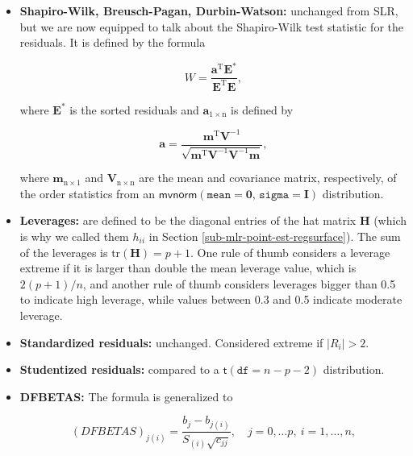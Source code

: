 \documentclass[]{book}
\providecommand{\tightlist}{%
  \setlength{\itemsep}{0pt}\setlength{\parskip}{0pt}}
\numberwithin{equation}{chapter}
\numberwithin{figure}{chapter}
\theoremstyle{plain}
\theoremstyle{definition}
\theoremstyle{remark}
\theoremstyle{definition}
\theoremstyle{definition}
\theoremstyle{remark}
\begin{document}
\begin{itemize}
\tightlist
\item
  \textbf{Shapiro-Wilk, Breusch-Pagan, Durbin-Watson:} unchanged from
  SLR, but we are now equipped to talk about the Shapiro-Wilk test
  statistic for the residuals. It is defined by the formula

  \begin{equation}
   W=\frac{\mathbf{a}^{\mathrm{T}}\mathbf{E}^{\ast}}{\mathbf{E}^{\mathrm{T}}\mathbf{E}},
   \end{equation}

  where \(\mathbf{E}^{\ast}\) is the sorted residuals and
  \(\mathbf{a}_{1\times\mathrm{n}}\) is defined by

  \begin{equation}
   \mathbf{a}=\frac{\mathbf{m}^{\mathrm{T}}\mathbf{V}^{-1}}{\sqrt{\mathbf{m}^{\mathrm{T}}\mathbf{V}^{-1}\mathbf{V}^{-1}\mathbf{m}}},
   \end{equation}

  where \(\mathbf{m}_{\mathrm{n}\times1}\) and
  \(\mathbf{V}_{\mathrm{n}\times\mathrm{n}}\) are the mean and
  covariance matrix, respectively, of the order statistics from an
  \(\mathsf{mvnorm}\left(\mathtt{mean}=\mathbf{0},\,\mathtt{sigma}=\mathbf{I}\right)\)
  distribution.
\item
  \textbf{Leverages:} are defined to be the diagonal entries of the hat
  matrix \(\mathbf{H}\) (which is why we called them \(h_{ii}\) in
  Section \ref{sub-mlr-point-est-regsurface}). The sum of the leverages
  is \(\mbox{tr}(\mathbf{H})=p+1\). One rule of thumb considers a
  leverage extreme if it is larger than double the mean leverage value,
  which is \(2(p+1)/n\), and another rule of thumb considers leverages
  bigger than 0.5 to indicate high leverage, while values between 0.3
  and 0.5 indicate moderate leverage.
\item
  \textbf{Standardized residuals:} unchanged. Considered extreme if
  \(|R_{i}|>2\).
\item
  \textbf{Studentized residuals:} compared to a
  \(\mathsf{t}(\mathtt{df}=n-p-2)\) distribution.
\item
  \textbf{DFBETAS:} The formula is generalized to

  \begin{equation}
     (DFBETAS)_{j(i)}=\frac{b_{j}-b_{j(i)}}{S_{(i)}\sqrt{c_{jj}}},\quad j=0,\ldots p,\ i=1,\ldots,n,
     \end{equation}


\end{itemize}
\end{document}

